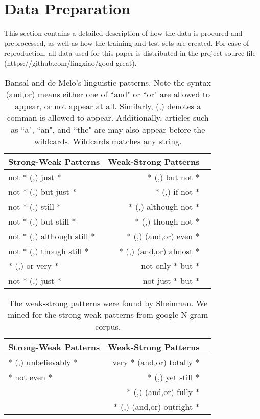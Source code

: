 \section{Data Preparation}

This section contains a detailed description of how the data is procured and preprocessed, as well as how the training and test sets are created. For ease of reproduction, all data used for this paper is distributed in the project source file (https://github.com/lingxiao/good-great).

\begin{table}
\small
\centering
\begin{tabular}{|l|rl|}
\hline \bf Strong-Weak Patterns & \bf Weak-Strong Patterns & \\ \hline
not  * (,) just *           &  * (,) but not *         & \\
not  * (,) but just *       &  * (,) if not *          & \\
not  * (,) still *          &  * (,) although not *    &  \\
not  * (,) but still *      &  * (,) though not *      & \\
not  * (,) although still * &  * (,) (and,or) even *   & \\
not  * (,) though still *   &  * (,) (and,or) almost * & \\
* (,) or very *             & not only * but *         & \\
not  * (,) just *           & not just * but *         & \\
\hline
\end{tabular}
\caption{\label{font-table} Bansal and de Melo's linguistic patterns. Note the syntax (and,or) means either one of ``and" or ``or" are allowed to appear, or not appear at all. Similarly, (,) denotes a comman is allowed to appear. Additionally, articles such as ``a", ``an", and ``the" are may also appear before the wildcards. Wildcards matches any string.}
\end{table}

\begin{table}
\small
\centering
\begin{tabular}{|l|rl|}
\hline \bf Strong-Weak Patterns & \bf Weak-Strong Patterns & \\ \hline
* (,) unbelievably *     &  very * (and,or) totally *   & \\
* not even *             &  * (,) yet still *           & \\
                         &  * (,) (and,or) fully *      & \\
                         &  * (,) (and,or) outright *   & \\
\hline
\end{tabular}
\caption{\label{font-table} The weak-strong patterns were found by Sheinman. We mined for the strong-weak patterns from google N-gram corpus.}
\end{table}


